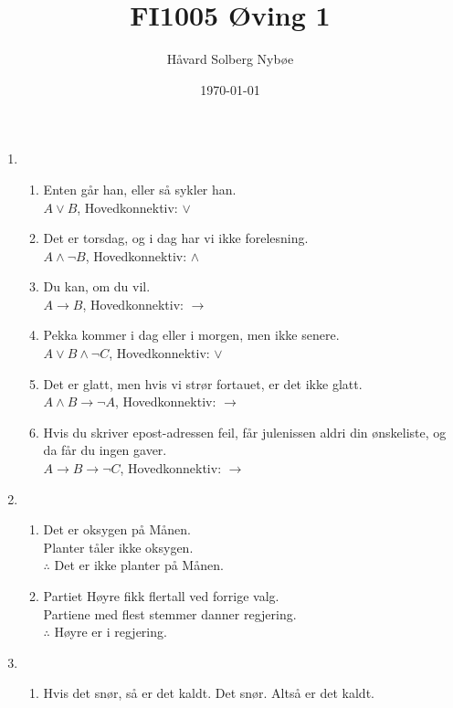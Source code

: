 \documentclass[a4paper, 12pt]{article}  %
\title{FI1005 Øving 1}                         %
\author{Håvard Solberg Nybøe}           %
\date{\today}                           %
\begin{document}
\maketitle


\begin{enumerate}
    \item [\boxed{1}]
    \begin{enumerate}
        \item Enten går han, eller så sykler han.
        \\ \(A \lor B\), Hovedkonnektiv: \(\lor\)
        \item Det er torsdag, og i dag har vi ikke forelesning.
        \\ \(A \land \neg B\), Hovedkonnektiv: \(\land\)
        \item Du kan, om du vil.
        \\ \(A \to B\), Hovedkonnektiv: \(\to\)
        \item Pekka kommer i dag eller i morgen, men ikke senere.
        \\ \(A \lor B \land \neg C\), Hovedkonnektiv: \(\lor\)
        \item Det er glatt, men hvis vi strør fortauet, er det ikke glatt.
        \\ \(A \land B \to \neg A\), Hovedkonnektiv: \(\to\)
        \item Hvis du skriver epost-adressen feil, får julenissen aldri din ønskeliste, og da får du ingen gaver.
        \\ \(A \to B \to \neg C\), Hovedkonnektiv: \(\to\)
    \end{enumerate}
    \item [\boxed{2}]
    \begin{enumerate}
        \item Det er oksygen på Månen. 
        \\ Planter tåler ikke oksygen. 
        \\ \(\therefore\) Det er ikke planter på Månen.
        \item Partiet Høyre fikk flertall ved forrige valg. 
        \\ Partiene med flest stemmer danner regjering. 
        \\ \(\therefore\) Høyre er i regjering.
    \end{enumerate}
    \item [\boxed{3}]
    \begin{enumerate}
        \item Hvis det snør, så er det kaldt. Det snør. Altså er det kaldt.

\end{enumerate}
\end{enumerate}
\end{document}
